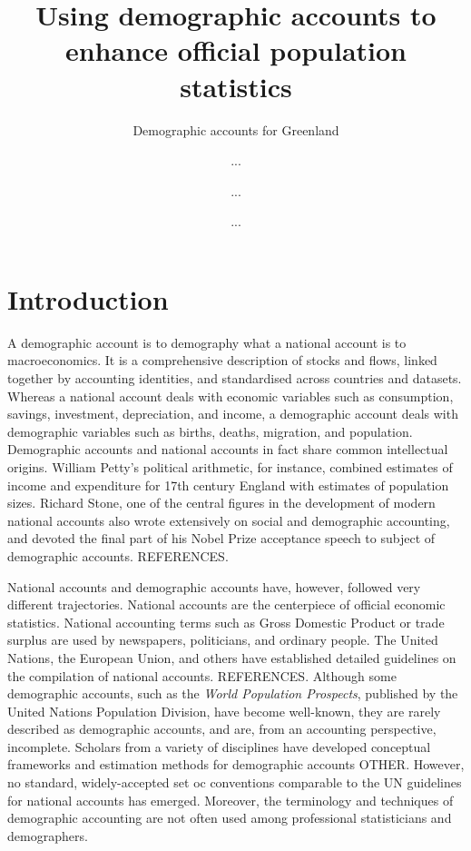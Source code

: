 \documentclass[USenglish]{article}
\begin{document}

  \author*[1]{...}
  \author[2]{...}
  \author[1]{...} 
  \title{ Using demographic accounts to enhance official population statistics  }
  \subtitle{Demographic accounts for Greenland}
  \aop

\maketitle



\section{Introduction} 

A demographic account is to demography what a national account is to macroeconomics. It is a comprehensive description of stocks and flows, linked together by accounting identities, and standardised across countries and datasets. Whereas a national account deals with economic variables such as consumption, savings, investment, depreciation, and income, a demographic account deals with demographic variables such as births, deaths, migration, and population. Demographic accounts and national accounts in fact share common intellectual origins. William Petty's political arithmetic, for instance, combined estimates of income and expenditure for 17th century England with estimates of population sizes. Richard Stone, one of the central figures in the development of modern national accounts also wrote extensively on social and demographic accounting, and devoted the final part of his Nobel Prize acceptance speech to subject of demographic accounts. REFERENCES.

National accounts and demographic accounts have, however, followed very different trajectories. National accounts are the centerpiece of official economic statistics. National accounting terms such as Gross Domestic Product or trade surplus are used by newspapers, politicians, and ordinary people. The United Nations, the European Union, and others have established detailed guidelines on the compilation of national accounts. REFERENCES. Although some demographic accounts, such as the \emph{World Population Prospects}, published by the United Nations Population Division, have become well-known, they are rarely described as demographic accounts, and are, from an accounting perspective, incomplete. Scholars from a variety of disciplines have developed conceptual frameworks and estimation methods for demographic accounts \citep{rees1977spatial,rees1986data, rees1979regional,rees1985choices,rees2012ethnic,bryant2013bayesian, wheldon2013reconstructing,willekens2011population} OTHER. However, no standard, widely-accepted set oc conventions comparable to the UN guidelines for national accounts has emerged. Moreover, the terminology and techniques of demographic accounting are not often used among professional statisticians and demographers.
\end{document}
